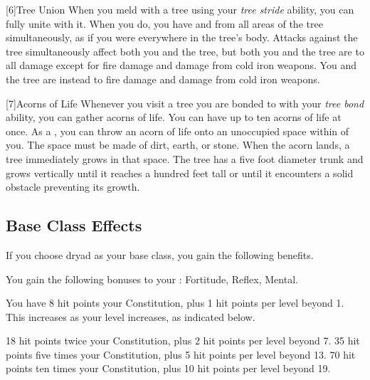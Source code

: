         [6]{Tree Union} When you meld with a tree using your \textit{tree stride} ability, you can fully unite with it.
        When you do, you have  and  from all areas of the tree simultaneously, as if you were everywhere in the tree's body.
        Attacks against the tree simultaneously affect both you and the tree, but both you and the tree are \impervious to all damage except for fire damage and damage from cold iron weapons.
        You and the tree are instead \vulnerable to fire damage and damage from cold iron weapons.

        [7]{Acorns of Life} Whenever you visit a tree you are bonded to with your \textit{tree bond} ability, you can gather acorns of life.
        You can have up to ten acorns of life at once.
        As a , you can throw an acorn of life onto an unoccupied  space within \medrange of you.
        The space must be made of dirt, earth, or stone.
        When the acorn lands, a tree immediately grows in that space.
        The tree has a five foot diameter trunk and grows vertically until it reaches a hundred feet tall or until it encounters a solid obstacle preventing its growth.

    \subsection{Base Class Effects}
        If you choose dryad as your base class, you gain the following benefits.

        You gain the following bonuses to your :  Fortitude,  Reflex,  Mental.

            You have 8 hit points \add  your Constitution, plus 1 hit points per level beyond 1.
            This increases as your level increases, as indicated below.
            \begin{itemize}
                 18 hit points \add twice your Constitution, plus 2 hit points per level beyond 7.
                 35 hit points \add five times your Constitution, plus 5 hit points per level beyond 13.
                 70 hit points \add ten times your Constitution, plus 10 hit points per level beyond 19.
            \end{itemize}

